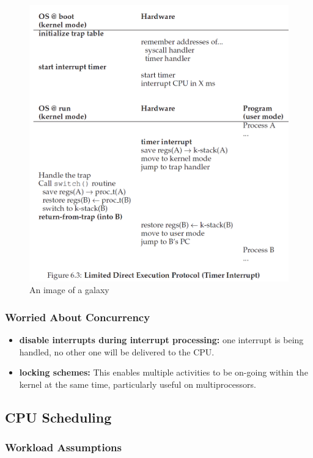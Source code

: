 \documentclass{article}
\begin{document}
\begin{figure}[H]
    \centering
    \includegraphics[width=13cm] {fig6.3.png}
    \caption{An image of a galaxy}
    \label{fig:galaxy}
\end{figure}

\subsubsection{Worried About Concurrency}
\begin{itemize}
    \item \textbf{disable interrupts during interrupt processing: }one interrupt is being handled, no other one will be delivered to the CPU.
    \item \textbf{locking schemes: }This enables multiple activities to be on-going within the kernel at the same time, particularly useful on multiprocessors.
\end{itemize}

\pagebreak
\pagebreak

\subsection{CPU Scheduling}

\subsubsection{Workload Assumptions}
\end{document}
